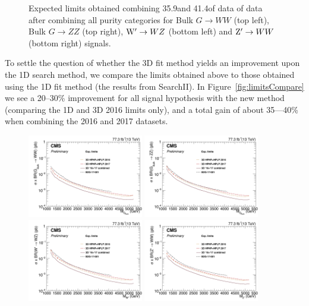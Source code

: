 \begin{figure}[h!]
\caption{Expected limits obtained combining 35.9\fbinv and 41.4\fbinv of data of data after combining all purity categories for Bulk $G\rightarrow WW$ (top left), Bulk $G\rightarrow ZZ$ 
(top right), $\mathrm{W}^\prime\rightarrow WZ$ (bottom left) and $\mathrm{Z}^\prime\rightarrow WW$ (bottom right) signals.}
\label{fig:searchIII:limitsCombo}
\end{figure}
To settle the question of whether the 3D fit method yields an improvement upon the 1D search method, we compare the limits obtained above to those obtained using the 1D fit method (the results from SearchII). In Figure~\ref{fig:limitsCompare} we see a 20--30\% improvement for all signal hypothesis with the new method (comparing the 1D and 3D 2016 limits only), and a total gain of about 35---40\% when combining the 2016 and 2017 datasets.
\begin{figure}[h!]
\centering
\includegraphics[width=0.45\textwidth]{figures/analysis/search3/AN-17-303/limits/limits_BulkGWW_compare.png}
\includegraphics[width=0.45\textwidth]{figures/analysis/search3/AN-17-303/limits/limits_BulkGZZ_compare.png}\\
\includegraphics[width=0.45\textwidth]{figures/analysis/search3/AN-17-303/limits/limits_WprimeWZ_compare.png}
\includegraphics[width=0.45\textwidth]{figures/analysis/search3/AN-17-303/limits/limits_ZprimeWW_compare.png}

\end{figure}
